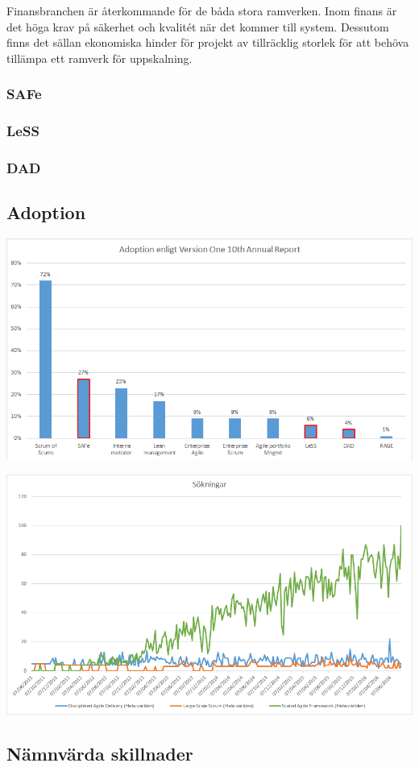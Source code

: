 		
		Finansbranchen är återkommande för de båda stora ramverken. Inom finans är det höga krav på säkerhet och kvalitét när det kommer till system. Dessutom finns det sällan ekonomiska hinder för projekt av tillräcklig storlek för att behöva tillämpa ett ramverk för uppskalning. 
		
		
	
	
		
	
	\subsubsection{SAFe}	
		
	\subsubsection{LeSS}
		
	\subsubsection{DAD}
	
	\subsection{Adoption}
	
		\begin{center}
			\includegraphics{Grafer/AnnualReport_Adoption.png}
		\end{center}
	
	
		\begin{center}
			\includegraphics{Grafer/Google_sokningar.png}
		\end{center}
	\cite{google_stats}
	
		
	\subsection{Nämnvärda skillnader}